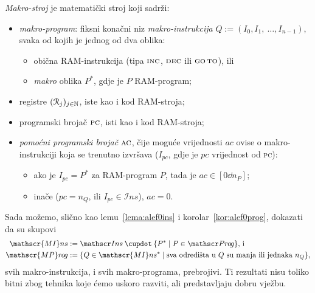 \begin{definicija}[{name=[makro-stroj]}]
\emph{Makro-stroj} je matematički stroj koji sadrži:
\begin{itemize}
    \item \emph{makro-program}: fiksni konačni niz \emph{makro-instrukcija} $Q:=(I_0, I_1,~\dotsc, I_{n-1})$, svaka od kojih je jednog od dva oblika:
    \begin{itemize}
        \item obična RAM-instrukcija (tipa $\textsc{inc}$, $\textsc{dec}$ ili $\textsc{go\,to}$), ili
        \item  \emph{makro} oblika $P^*$, gdje je $P$ RAM-program;
    \end{itemize}
    \item registre $(\mathcal R_{j})_{j\in{\mathbb N}}$, iste kao i kod RAM-stroja;
    \item programski brojač $\textsc{pc}$, isti kao i kod RAM-stroja;
    \item \emph{pomoćni programski brojač} $\textsc{ac}$, čije  moguće vrijednosti $ac$ ovise o makro-instrukciji koja se trenutno izvršava ($I_{pc}$, gdje je $pc$ vrijednost od \textsc{pc}):
    \begin{itemize}
        \item ako je $I_{pc}=P^*$ za RAM-program $P$, tada je $ac\in[0\dd n_P]$;
        \item inače ($pc=n_Q$, ili $I_{pc}\!\in\mathscr Ins$), $ac=0$.\qedhere
    \end{itemize}
\end{itemize}
\end{definicija}
\noindent Sada možemo, slično kao lemu~\ref{lema:alef0ins} i korolar~\ref{kor:alef0prog}, dokazati da su skupovi
\begin{align}
	\mathscr{MI}ns&:=\mathscr Ins\mathbin{\dcup}\{P^*\mid P\in\mathscr Pr\mspace{-1mu}o\mspace{-2mu}g\}\text{, i}\\
	\mathscr{MP}r\mspace{-1mu}o\mspace{-2mu}g&:=\{Q\in\mathscr{MI}ns^*\mid\text{sva odredišta u $Q$ su manja ili jednaka $n_Q$}\}\text,
\end{align}
svih makro-instrukcija, i svih makro-programa, prebrojivi. Ti rezultati nisu toliko bitni zbog tehnika koje ćemo uskoro razviti, ali predstavljaju dobru vježbu. %


